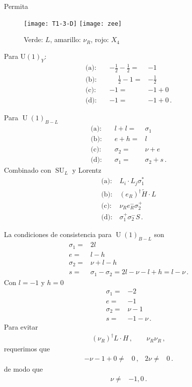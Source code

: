 \begin{frame}
Permita


\begin{figure}
  \centering
  \texttt{[image: T1-3-D]} \hspace{1cm}
  \texttt{[image: zee]}
  \caption{Verde: $L$, amarillo: $\nu_R$, rojo: $X_4$  }
  \label{fig:gg}
\end{figure}
\end{frame}

\begin{frame}
Para $\operatorname{U(1)}_Y$:
\begin{align}
   \text{(a)}:&\  &-\frac{1}{2}-\frac{1}{2}=&-1 \nonumber\\
   \text{(b)}:&\ &\phantom{-} \frac{1}{2}-1=&-\frac{1}{2} \nonumber\\
  \text{(c)}:&\ &-1=&-1+0  \nonumber\\
  \text{(d)}:&\  & -1=&-1+0  \,.
\end{align}

Para $\operatorname{U}(1)_{B-L}$
\begin{align}
  \text{(a)}:&\  &l +l=&\sigma_1 \nonumber\\
  \text{(b)}:&\  &e+h=&l \nonumber\\
  \text{(c)}:&\  &\sigma_2=&\nu+e \nonumber\\
  \text{(d)}:&\ &\sigma_1=&\sigma_2+s\,.
\end{align}
Combinado con $\operatorname{SU}_L$ y Lorentz
\begin{align}
  \text{(a)}:&\  L_i\cdot L_j \sigma_1^{*} \nonumber\\
  \text{(b)}:&\  \left( e_R \right)^{\dagger} \widetilde{H} \cdot L \nonumber\\
  \text{(c)}:&\  \nu_R e_R^- \sigma_2^+  \nonumber\\
  \text{(d)}:&\ \sigma_1^+\sigma_2^{-} S\,.
\end{align}

La condiciones de consistencia para $\operatorname{U}(1)_{B-L}$ son 
\begin{align}
    \sigma_1=&2l \nonumber\\
  e=&l-h \nonumber\\
  \sigma_2=&\nu+l-h \nonumber\\
  s=&\sigma_1-\sigma_2=2l-\nu-l+h=l-\nu\,.
\end{align}
Con $l=-1$ y $h=0$
\begin{align}
   \sigma_1=&-2 \nonumber\\
    e=&-1 \nonumber\\
\sigma_2=&\nu-1 \nonumber\\
   s=&-1-\nu\,.
\end{align}
Para evitar
\begin{align}
 \left( \nu_R \right)^{\dagger}  L\cdot H\,,\qquad \nu_R \nu_R\,,
\end{align}
requerimos que
\begin{align}
  -\nu -1 +0 \ne& 0\,, & 2 \nu\ne& 0\,.
\end{align}
de modo que
\begin{align}
  \nu\ne& -1,0\,.
\end{align}


\end{frame}

